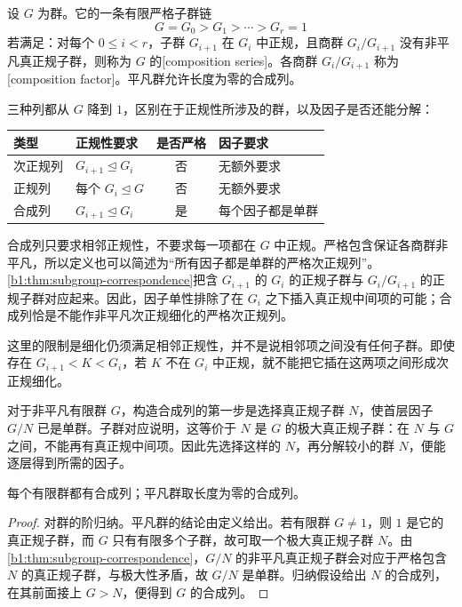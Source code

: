 \begin{definition}\label{b1:def:composition-series}
	设 \(G\) 为群。它的一条有限严格子群链
	\[
		G=G_0>G_1>\cdots>G_r=1
	\]
	若满足：对每个 \(0\le i<r\)，子群 \(G_{i+1}\) 在 \(G_i\) 中正规，且商群 \(G_i/G_{i+1}\) 没有非平凡真正规子群，则称为 \(G\) 的[composition series]。各商群 \(G_i/G_{i+1}\) 称为[composition factor]。平凡群允许长度为零的合成列。
\end{definition}

三种列都从 \(G\) 降到 \(1\)，区别在于正规性所涉及的群，以及因子是否还能分解：
\begin{center}
	\begin{tabularx}{\linewidth}{@{}lXcX@{}}
		\toprule
		类型 & 正规性要求 & 是否严格 & 因子要求 \\
		\midrule
		次正规列 & \(G_{i+1}\trianglelefteq G_i\) & 否 & 无额外要求 \\
		正规列 & 每个 \(G_i\trianglelefteq G\) & 否 & 无额外要求 \\
		合成列 & \(G_{i+1}\trianglelefteq G_i\) & 是 & 每个因子都是单群 \\
		\bottomrule
	\end{tabularx}
\end{center}
合成列只要求相邻正规性，不要求每一项都在 \(G\) 中正规。严格包含保证各商群非平凡，所以定义也可以简述为“所有因子都是单群的严格次正规列”。\cref{b1:thm:subgroup-correspondence}把含 \(G_{i+1}\) 的 \(G_i\) 的正规子群与 \(G_i/G_{i+1}\) 的正规子群对应起来。因此，因子单性排除了在 \(G_i\) 之下插入真正规中间项的可能；合成列恰是不能作非平凡次正规细化的严格次正规列。

\ProseParagraphBreak
这里的限制是细化仍须满足相邻正规性，并不是说相邻项之间没有任何子群。即使存在 \(G_{i+1}<K<G_i\)，若 \(K\) 不在 \(G_i\) 中正规，就不能把它插在这两项之间形成次正规细化。

\ProseParagraphBreak
对于非平凡有限群 \(G\)，构造合成列的第一步是选择真正规子群 \(N\)，使首层因子 \(G/N\) 已是单群。子群对应说明，这等价于 \(N\) 是 \(G\) 的极大真正规子群：在 \(N\) 与 \(G\) 之间，不能再有真正规中间项。因此先选择这样的 \(N\)，再分解较小的群 \(N\)，便能逐层得到所需的因子。

\begin{proposition}[有限群的合成列存在性]\label{b1:prop:finite-composition-series}
	每个有限群都有合成列；平凡群取长度为零的合成列。
\end{proposition}
\begin{proof}
	对群的阶归纳。平凡群的结论由定义给出。若有限群 \(G\ne1\)，则 \(1\) 是它的真正规子群，而 \(G\) 只有有限多个子群，故可取一个极大真正规子群 \(N\)。由\cref{b1:thm:subgroup-correspondence}，\(G/N\) 的非平凡真正规子群会对应于严格包含 \(N\) 的真正规子群，与极大性矛盾，故 \(G/N\) 是单群。归纳假设给出 \(N\) 的合成列，在其前面接上 \(G>N\)，便得到 \(G\) 的合成列。
\end{proof}

